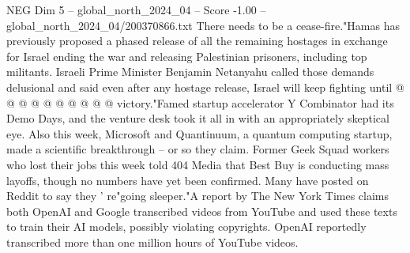 \begin{textsample}{NEG Dim 5 – global\_north\_2024\_04 – Score -1.00 – global\_north\_2024\_04/200370866.txt}
There needs to be a cease-fire."Hamas has previously proposed a phased release of all the remaining hostages in exchange for Israel ending the war and releasing Palestinian prisoners, including top militants.
Israeli Prime Minister Benjamin Netanyahu called those demands delusional and said even after any hostage release, Israel will keep fighting until @ @ @ @ @ @ @ @ @ @ victory."Famed startup accelerator Y Combinator had its Demo Days, and the venture desk took it all in with an appropriately skeptical eye.
Also this week, Microsoft and Quantinuum, a quantum computing startup, made a scientific breakthrough -- or so they claim.
Former Geek Squad workers who lost their jobs this week told 404 Media that Best Buy is conducting mass layoffs, though no numbers have yet been confirmed.
Many have posted on Reddit to say they ' re"going sleeper."A report by The New York Times claims both OpenAI and Google transcribed videos from YouTube and used these texts to train their AI models, possibly violating copyrights.
OpenAI reportedly transcribed more than one million hours of YouTube videos.

\end{textsample}
